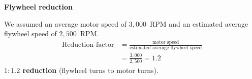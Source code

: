 \documentclass[11pt,border=0pt]{standalone}
\begin{document}
\colorbox{panel}{%
  \begin{minipage}{94mm}
  \color{white}\raggedright
  \setlength{\fboxsep}{3pt}
  \setlength{\abovedisplayskip}{6pt}
  \setlength{\abovedisplayshortskip}{6pt}
  \setlength{\belowdisplayskip}{6pt}
  \setlength{\belowdisplayshortskip}{6pt}
  {\Large\bfseries Flywheel reduction\par}
  \smallskip
  We assumed an average motor speed of \(3{,}000\)~RPM and an estimated
  average flywheel speed of \(2{,}500\)~RPM.
  \[
    \begin{aligned}
      \text{Reduction factor} & =
        \frac{\text{motor speed}}{\text{estimated average flywheel speed}} \\
      & = \frac{3{,}000}{2{,}500} = \boxed{1.2}
    \end{aligned}
  \]
  \textbf{\(1{:}1.2\) reduction} (flywheel turns to motor turns).\par
  \end{minipage}%
}
\end{document}
